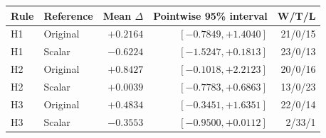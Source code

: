 \begin{tabular}{llrrr}
\toprule
Rule & Reference & Mean $\Delta$ & Pointwise 95\% interval & W/T/L\\
\midrule
H1 & Original & $+0.2164$ & $[-0.7849, +1.4040]$ & 21/0/15\\
H1 & Scalar & $-0.6224$ & $[-1.5247, +0.1813]$ & 23/0/13\\
H2 & Original & $+0.8427$ & $[-0.1018, +2.2123]$ & 20/0/16\\
H2 & Scalar & $+0.0039$ & $[-0.7783, +0.6863]$ & 13/0/23\\
H3 & Original & $+0.4834$ & $[-0.3451, +1.6351]$ & 22/0/14\\
H3 & Scalar & $-0.3553$ & $[-0.9500, +0.0112]$ & 2/33/1\\
\bottomrule
\end{tabular}
